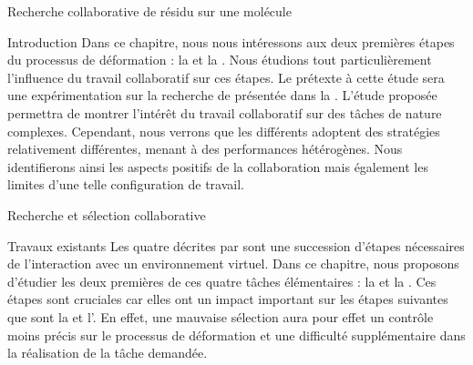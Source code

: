 \documentclass[myfrancais]{mythesis}
\begin{document}
\begin{mychapter}{Recherche collaborative de résidu sur une molécule}
\begin{mysection}{Introduction}
			Dans ce chapitre, nous nous intéressons aux deux premières étapes du processus de déformation : la  et la  .
			Nous étudions tout particulièrement l'influence du travail collaboratif sur ces étapes.
			Le prétexte à cette étude sera une expérimentation sur la recherche de  présentée dans la .
			L'étude proposée permettra de montrer l'intérêt du travail collaboratif sur des tâches de nature complexes.
			Cependant, nous verrons que les différents  adoptent des stratégies relativement différentes, menant à des performances hétérogènes.
			Nous identifierons ainsi les aspects positifs de la collaboration mais également les limites d'une telle configuration de travail.
		\end{mysection}
		\begin{mysection}{Recherche et sélection collaborative}
			\begin{mysubsection}{Travaux existants}
				Les quatre  décrites par  sont une succession d'étapes nécessaires de l'interaction avec un environnement virtuel.
				Dans ce chapitre, nous proposons d'étudier les deux premières de ces quatre tâches élémentaires : la  et la .
				Ces étapes sont cruciales car elles ont un impact important sur les étapes suivantes que sont la  et l'.
				En effet, une mauvaise sélection aura pour effet un contrôle moins précis sur le processus de déformation et une difficulté supplémentaire dans la réalisation de la tâche demandée.


\end{mysubsection}
\end{mysection}
\end{mychapter}
\end{document}
